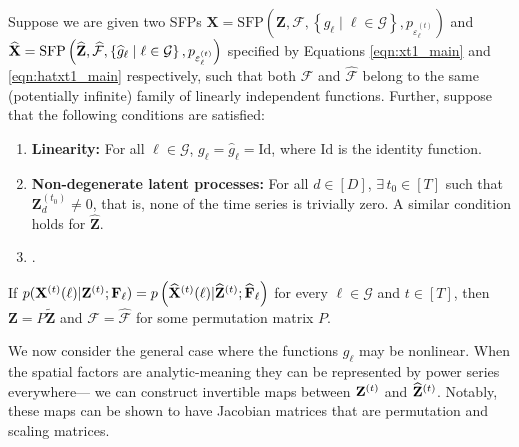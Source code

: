 \begin{theorem} \label{thm:linear_identifiability}
    Suppose we are given two SFPs $\mathbf{X} = \text{SFP}\left(\mathbf{Z}, \mathcal{F}, \left\{ g_{\ell} \mid \ell \in \mathcal{G} \right\}, p_{\varepsilon_{\ell}^{(t)}} \right)$ and $\widehat{\mathbf{X}} = \text{SFP}\left(\widehat{\mathbf{Z}}, \widehat{\mathcal{F}}, \left\{\widehat{g}_{\ell} \mid \ell \in \mathcal{G} \right\}, {p_{{\varepsilon}_{\ell}^{(t)}}} \right)$ specified by Equations \ref{eqn:xt1_main} and \ref{eqn:hatxt1_main} respectively, such that both $\mathcal{F}$ and $\widehat{\mathcal{F}}$ belong to the same (potentially infinite) family of linearly independent functions. Further, suppose that the following conditions are satisfied: 
    \begin{enumerate}[noitemsep, topsep=0pt]
        \item \textbf{Linearity:} For all $\ell \in \mathcal{G}$, $\displaystyle g_{\ell} = \widehat{g}_{\ell} = \text{Id}$, where $\text{Id}$ is the identity function.
        \item \textbf{Non-degenerate latent processes:} For all $d \in [D]$,  $\exists \,  t_0 \in [T]$ such that $\mathbf{Z}^{(t_0)}_d \neq 0$, that is, none of the time series is trivially zero. A similar condition holds for $\widehat{\mathbf{Z}}$.
        \item {}.
    \end{enumerate}
     If $p(\mathbf{X}^{(t)}(\ell) | \mathbf{Z}^{(t)} ; \mathbf{F}_{\ell}) = p \left(\widehat{\mathbf{X}}^{(t)}(\ell)| \widehat{\mathbf{Z}}^{(t)}; \widehat{\mathbf{F}}_{\ell} \right)$ for every $\ell \in \mathcal{G}$ and $t \in [T]$, then $\mathbf{Z} = P\tilde{\mathbf{Z}}$ and $\mathcal{F} = \widehat{\mathcal{F}}$ for some permutation matrix $P$. \label{thm:linear_sfp_identifiability}
\end{theorem}
We now consider the general case where the functions $g_\ell$ may be nonlinear. When the spatial factors are analytic-meaning they can be represented by power series everywhere— we can construct invertible maps between $\mathbf{Z}^{(t)}$ and $\widehat{\mathbf{Z}}^{(t)}$. Notably, these maps can be shown to have Jacobian matrices that are permutation and scaling matrices.

